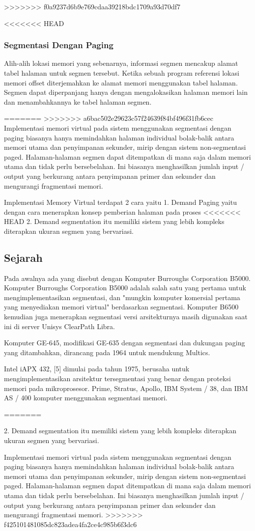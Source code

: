 >>>>>>> f0a9237d6b9e769cdaa39218bdc1709a93d70df7

<<<<<<< HEAD
\subsubsection{Segmentasi Dengan Paging}
Alih-alih lokasi memori yang sebenarnya, informasi segmen mencakup alamat tabel halaman untuk segmen tersebut. Ketika sebuah program referensi lokasi memori offset diterjemahkan ke alamat memori menggunakan tabel halaman. Segmen dapat diperpanjang hanya dengan mengalokasikan halaman memori lain dan menambahkannya ke tabel halaman segmen.

=======
>>>>>>> a6bac502e29623c57f24639f84bf496f31fb6cec
Implementasi memori virtual pada sistem menggunakan segmentasi dengan paging biasanya hanya memindahkan halaman individual bolak-balik antara memori utama dan penyimpanan sekunder, mirip dengan sistem non-segmentasi paged. Halaman-halaman segmen dapat ditempatkan di mana saja dalam memori utama dan tidak perlu bersebelahan. Ini biasanya menghasilkan jumlah input / output yang berkurang antara penyimpanan primer dan sekunder dan mengurangi fragmentasi memori.

Implementasi Memory Virtual terdapat 2 cara yaitu 
	1. Demand Paging yaitu dengan cara menerapkan konsep pemberian halaman pada proses
<<<<<<< HEAD
	2. Demand segmentation itu memiliki sistem yang lebih kompleks diterapkan ukuran segmen yang bervariasi.
\subsection{Sejarah}
Pada awalnya ada yang disebut dengan Komputer Burroughs Corporation B5000. Komputer Burroughs Corporation B5000 adalah salah satu yang pertama untuk mengimplementasikan segmentasi, dan "mungkin komputer komersial pertama yang menyediakan memori virtual" berdasarkan segmentasi. Komputer B6500 kemudian juga menerapkan segmentasi versi arsitekturnya masih digunakan saat ini di server Unisys ClearPath Libra.

Komputer GE-645, modifikasi GE-635 dengan segmentasi dan dukungan paging yang ditambahkan, dirancang pada 1964 untuk mendukung Multics.

Intel iAPX 432, [5] dimulai pada tahun 1975, berusaha untuk mengimplementasikan arsitektur tersegmentasi yang benar dengan proteksi memori pada mikroprosesor.
Prime, Stratus, Apollo, IBM System / 38, dan IBM AS / 400 komputer menggunakan segmentasi memori.

=======
	
2. Demand segmentation itu memiliki sistem yang lebih kompleks diterapkan ukuran segmen yang bervariasi.

Implementasi memori virtual pada sistem menggunakan segmentasi dengan paging biasanya hanya memindahkan halaman individual bolak-balik antara memori utama dan penyimpanan sekunder, mirip dengan sistem non-segmentasi paged. Halaman-halaman segmen dapat ditempatkan di mana saja dalam memori utama dan tidak perlu bersebelahan. Ini biasanya menghasilkan jumlah input / output yang berkurang antara penyimpanan primer dan sekunder dan mengurangi fragmentasi memori.
>>>>>>> f425101481085dc823adea4fa2ce4c985b6f3dc6

